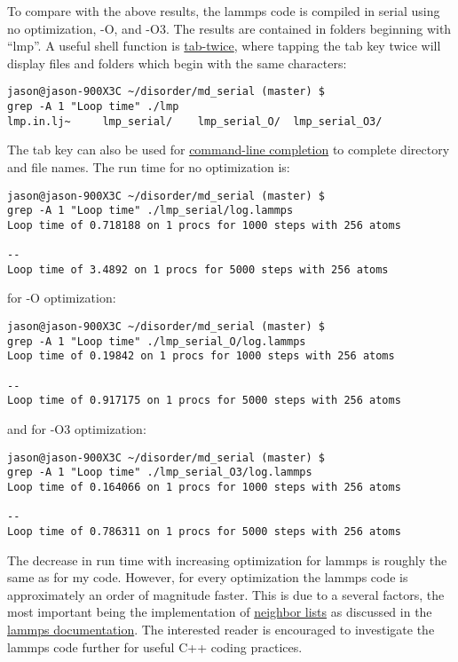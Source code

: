 To compare with the above results, the lammps code is compiled in serial 
using no optimization, -O, and -O3.  
The results are contained in folders beginning with ``lmp''.  A useful 
shell function is 
\href{http://www.tuxfiles.org/linuxhelp/tabtrick.html}{tab-twice}, 
where tapping the tab key twice 
will display files and folders which begin with the same 
characters:
\begin{lstlisting}
jason@jason-900X3C ~/disorder/md_serial (master) $ 
grep -A 1 "Loop time" ./lmp
lmp.in.lj~     lmp_serial/    lmp_serial_O/  lmp_serial_O3/
\end{lstlisting}
The tab key can also be used for  
\href{http://en.wikipedia.org/wiki/Command-line_completion}
{command-line completion} to complete directory and file names. The run 
time for no optimization is:
\begin{lstlisting}
jason@jason-900X3C ~/disorder/md_serial (master) $ 
grep -A 1 "Loop time" ./lmp_serial/log.lammps
Loop time of 0.718188 on 1 procs for 1000 steps with 256 atoms

--
Loop time of 3.4892 on 1 procs for 5000 steps with 256 atoms
\end{lstlisting}
for -O optimization:
\begin{lstlisting}
jason@jason-900X3C ~/disorder/md_serial (master) $ 
grep -A 1 "Loop time" ./lmp_serial_O/log.lammps
Loop time of 0.19842 on 1 procs for 1000 steps with 256 atoms

--
Loop time of 0.917175 on 1 procs for 5000 steps with 256 atoms
\end{lstlisting}
and for -O3 optimization:
\begin{lstlisting}
jason@jason-900X3C ~/disorder/md_serial (master) $ 
grep -A 1 "Loop time" ./lmp_serial_O3/log.lammps
Loop time of 0.164066 on 1 procs for 1000 steps with 256 atoms

--
Loop time of 0.786311 on 1 procs for 5000 steps with 256 atoms
\end{lstlisting}

The decrease in run time with increasing optimization 
for lammps is roughly the same as for my code. However, for every 
optimization the lammps code is approximately an order of 
magnitude faster.  This is 
due to a several factors, the most important being 
the implementation of 
\href{http://en.wikipedia.org/wiki/Neighbor_list}{neighbor lists} 
as discussed in the 
\href{http://lammps.sandia.gov/doc/neighbor.html}
{lammps documentation}. The interested reader is encouraged to 
investigate the lammps code further for useful C++ coding 
practices. 

